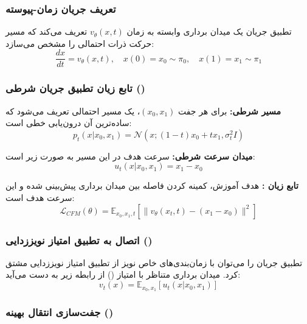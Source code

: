\begin{latin}
\subsubsection{تعریف جریان زمان-پیوسته}

تطبیق جریان یک میدان برداری وابسته به زمان $v_\theta(x, t)$ تعریف می‌کند که مسیر حرکت ذرات احتمالی را مشخص می‌سازد:
\begin{equation}
\frac{dx}{dt} = v_\theta(x, t), \quad x(0) = x_0 \sim \pi_0, \quad x(1) = x_1 \sim \pi_1
\end{equation}

\subsubsection{تابع زیان تطبیق جریان شرطی ()}

\textbf{مسیر شرطی:} برای هر جفت $(x_0, x_1)$، یک مسیر احتمالی تعریف می‌شود که ساده‌ترین آن درون‌یابی خطی است:
\begin{equation}
p_t(x | x_0, x_1) = \mathcal{N}\left(x; (1-t)x_0 + t x_1, \sigma_t^2 I\right)
\end{equation}



\textbf{میدان سرعت شرطی:} سرعت هدف در این مسیر به صورت زیر است:
\begin{equation}
u_t(x | x_0, x_1) = x_1 - x_0
\end{equation}

\textbf{تابع زیان :} هدف آموزش، کمینه کردن فاصله بین میدان برداری پیش‌بینی شده و این سرعت هدف است:
\begin{equation}
\mathcal{L}_{CFM}(\theta) = \mathbb{E}_{x_0, x_1, t} \left[ \| v_\theta(x_t, t) - (x_1 - x_0) \|^2 \right]
\end{equation}

\subsubsection{اتصال به تطبیق امتیاز نویززدایی ()}

تطبیق جریان را می‌توان با زمان‌بندی‌های خاص نویز از تطبیق امتیاز نویززدایی مشتق کرد. میدان برداری متناظر با امتیاز () از رابطه زیر به دست می‌آید:
\begin{equation}
v_t(x) = \mathbb{E}_{x_0, x_1} [u_t(x | x_0, x_1)]
\end{equation}

\subsubsection{جفت‌سازی انتقال بهینه ()}


\end{latin}
